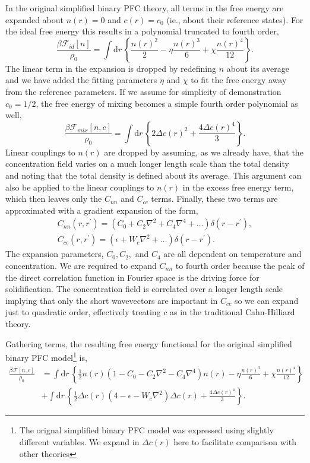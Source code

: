 \documentclass[showkeys, prb, reprint]{revtex4-1}
\renewcommand{\d}{\delta}       %
\newcommand{\F}{\mathcal{F}}    %
\renewcommand{\l}{\left}        %
\renewcommand{\r}{\right}       %
\newcommand{\f}{\frac}          %
\newcommand{\integrate}[1]{\int \mathrm{d}#1\,}
\begin{document}
In the original simplified binary PFC theory, all terms in the free energy are
expanded about $n(r) = 0$ and $c(r) = c_0$ (ie., about their reference states).
For the ideal free energy this results in a polynomial truncated to fourth
order,
%
\begin{equation}
    \label{ideal_expansion}
    \f{\beta\F_{id}[n]}{\rho_0} = \integrate{r}
    \l\lbrace \f{n(r)^2}{2} - \eta\f{n(r)^3}{6} + \chi\f{n(r)^4}{12} \r\rbrace.
\end{equation}
%
The linear term in the expansion is dropped by redefining $n$ about its average
and we have added the fitting parameters $\eta$ and $\chi$ to fit the free
energy away from the reference parameters. If we assume for simplicity of
demonstration $c_0 = 1/2$, the free energy of mixing becomes a simple fourth
order polynomial as well,
%
\begin{equation}
    \f{\beta\F_{mix}[n, c]}{\rho_0} = \integrate{r} \l\lbrace
       2\Delta c(r)^2 + \f{4\Delta c(r)^4}{3}
    \r\rbrace.
\end{equation}
%
Linear couplings to $n(r)$ are dropped by assuming, as we already have, that
the concentration field varies on a much longer length scale than the total
density and noting that the total density is defined about its average. This
argument can also be applied to the linear couplings to $n(r)$ in the excess free
energy term, which then leaves only the $C_{nn}$ and $C_{cc}$ terms. Finally, these
two terms are approximated with a gradient expansion of the form,
%
\begin{gather}
    C_{nn}(r, r^\prime) = \l( C_0 + C_2 \nabla^2 + C_4 \nabla^4 + \dots\r)
        \d(r - r^\prime), \\
    C_{cc}(r, r^\prime) = \l(\epsilon + W_c \nabla^2 + \dots\r)
        \d(r - r^\prime).
\end{gather}
%
The expansion parameters, $C_0, C_2,$ and $C_4$ are all dependent on
temperature and concentration. We are required to expand $C_{nn}$ to fourth
order because the peak of the direct correlation function in Fourier space is
the driving force for solidification.  The concentration field is correlated
over a longer length scale implying that only the short wavevectors are
important in $C_{cc}$ so we can expand just to quadratic order, effectively
treating $c$ as in the traditional Cahn-Hilliard theory.

Gathering terms, the resulting free energy functional for the original
simplified binary PFC model\footnote{The orignal simplified binary PFC model
was expressed using slightly different variables. We expand in $\Delta c(r)$
here to facilitate comparison with other theories} is,
%
\begin{align}
    \f{\beta\F[n, c]}{\rho_0} &= \integrate{r} \l\lbrace 
        \f{1}{2} n(r) \l( 1 - C_0 - C_2 \nabla^2 - C_4\nabla^4 \r) n(r)
      - \eta\f{n(r)^3}{6} + \chi\f{n(r)^4}{12} \r\rbrace \\
    &+ \integrate{r} \l\lbrace
        \f{1}{2} \Delta c(r) \l( 4 - \epsilon - W_c\nabla^2 \r) \Delta c(r) 
      + \f{4 \Delta c(r)^4}{3} \r\rbrace. \nonumber
\end{align}
%
\end{document}

